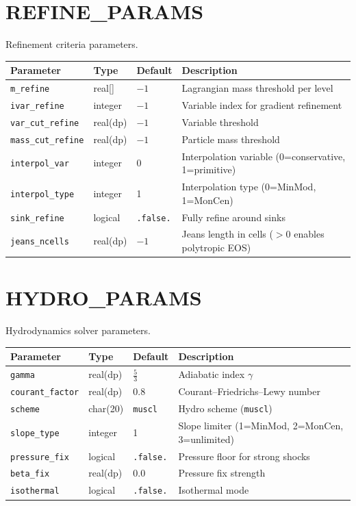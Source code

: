 \documentclass[11pt,fleqn]{book}
\begin{document}
\chapter{REFINE\_PARAMS}

Refinement criteria parameters.

\begin{longtable}{L{3.5cm} C{1.8cm} C{1.8cm} L{6cm}}
\toprule
\textbf{Parameter} & \textbf{Type} & \textbf{Default} & \textbf{Description} \\
\midrule
\endhead
\texttt{m\_refine} & real[] & $-1$ & Lagrangian mass threshold per level \\
\texttt{ivar\_refine} & integer & $-1$ & Variable index for gradient refinement \\
\texttt{var\_cut\_refine} & real(dp) & $-1$ & Variable threshold \\
\texttt{mass\_cut\_refine} & real(dp) & $-1$ & Particle mass threshold \\
\texttt{interpol\_var} & integer & 0 & Interpolation variable (0=conservative, 1=primitive) \\
\texttt{interpol\_type} & integer & 1 & Interpolation type (0=MinMod, 1=MonCen) \\
\texttt{sink\_refine} & logical & \texttt{.false.} & Fully refine around sinks \\
\texttt{jeans\_ncells} & real(dp) & $-1$ & Jeans length in cells ($>0$ enables polytropic EOS) \\
\bottomrule
\end{longtable}


\chapter{HYDRO\_PARAMS}

Hydrodynamics solver parameters.

\begin{longtable}{L{3.5cm} C{1.8cm} C{1.8cm} L{6cm}}
\toprule
\textbf{Parameter} & \textbf{Type} & \textbf{Default} & \textbf{Description} \\
\midrule
\endhead
\texttt{gamma} & real(dp) & $\frac{5}{3}$ & Adiabatic index $\gamma$ \\
\texttt{courant\_factor} & real(dp) & 0.8 & Courant--Friedrichs--Lewy number \\
\texttt{scheme} & char(20) & \texttt{muscl} & Hydro scheme (\texttt{muscl}) \\
\texttt{slope\_type} & integer & 1 & Slope limiter (1=MinMod, 2=MonCen, 3=unlimited) \\
\texttt{pressure\_fix} & logical & \texttt{.false.} & Pressure floor for strong shocks \\
\texttt{beta\_fix} & real(dp) & 0.0 & Pressure fix strength \\
\texttt{isothermal} & logical & \texttt{.false.} & Isothermal mode \\
\bottomrule
\end{longtable}
\end{document}

